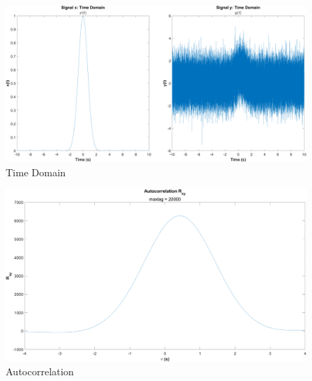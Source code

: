 \documentclass[12pt]{article}
\begin{document}
\begin{figure}[h]
	\centering
	\includegraphics[width=\textwidth]{exp3_time}
	\caption{\label{fig:exp3_time}Time Domain}
\end{figure}

\begin{figure}[h]
	\centering
	\includegraphics[width=\textwidth]{exp3_autocorr}
	\caption{\label{fig:exp3_autocorr}Autocorrelation}
\end{figure}
\end{document}
